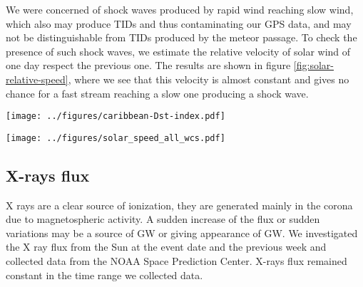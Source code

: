 We were concerned of shock waves produced by rapid wind reaching slow wind, which also may produce TIDs and thus contaminating our GPS data, and may not be distinguishable from TIDs produced by the meteor passage. To check the presence of such shock waves, we estimate the relative velocity of solar wind of one day respect the previous one. The results are shown in figure \ref{fig:solar-relative-speed}, where we see that this velocity is almost constant and gives no chance for a fast stream reaching a slow one producing a shock wave. 

\begin{figure*}
    \centering
    \texttt{[image: ../figures/caribbean-Dst-index.pdf]}
    \caption{Dst index for 2019 June 22th. Data obtained from WDC for Geomagnetism, Kyoto DST index service.}
    \label{fig:Dst_index}
\end{figure*}



\begin{figure*}
    \centering
    \texttt{[image: ../figures/solar\_speed\_all\_wcs.pdf]}
    \caption{Relative speed of solar wind at the event day and previous week respect the previous day, normalized with speed of sound. Each curve represents one day data.}
    \label{fig:solar-relative-speed}
\end{figure*}

\subsection{X-rays flux}

X rays are a clear source of ionization, they are generated mainly in the corona due to magnetospheric activity. A sudden increase of the flux or sudden variations may be a source of GW or giving appearance of GW. We investigated the X ray flux from the Sun at the event date and the previous week and collected data from the NOAA Space Prediction Center. %
X-rays flux remained constant in the time range we collected data.

